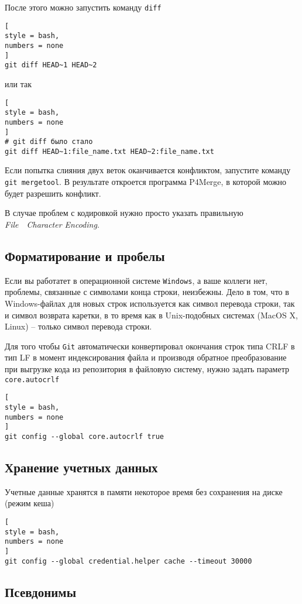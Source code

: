 \documentclass[%
	11pt,
	a4paper,
	utf8,
		]{article}
\begin{document}
После этого можно запустить команду \texttt{diff} 
\begin{lstlisting}[
style = bash,
numbers = none
]
git diff HEAD~1 HEAD~2
\end{lstlisting}
или так 
\begin{lstlisting}[
style = bash,
numbers = none
]
# git diff было стало
git diff HEAD~1:file_name.txt HEAD~2:file_name.txt
\end{lstlisting}

Если попытка слияния двух веток оканчивается конфликтом, запустите команду \texttt{git mergetool}. В результате откроется программа P4Merge, в которой можно будет разрешить конфликт.

В случае проблем с кодировкой нужно просто указать правильную \textit{File}~\textrightarrow~\textit{Character Encoding}.


\subsection{Форматирование и пробелы}

Если вы работатет в операционной системе \texttt{Windows}, а ваше коллеги нет, проблемы, связанные с символами конца строки, неизбежны. Дело в том, что в Windows-файлах для новых строк используется как символ перевода строки, так и символ возврата каретки, в то время как в Unix-подобных системах (MacOS X, Linux) -- только символ перевода строки.

Для того чтобы \texttt{Git} автоматически конвертировал окончания строк типа CRLF в тип LF в момент индексирования файла и производя обратное преобразование при выгрузке кода из репозитория в файловую систему, нужно задать параметр \texttt{core.autocrlf}
\begin{lstlisting}[
style = bash,
numbers = none
]
git config --global core.autocrlf true
\end{lstlisting}

\subsection{Хранение учетных данных}

Учетные данные хранятся в памяти некоторое время без сохранения на диске (режим кеша)
\begin{lstlisting}[
style = bash,
numbers = none
]
git config --global credential.helper cache --timeout 30000
\end{lstlisting}

\subsection{Псевдонимы}
\end{document}
